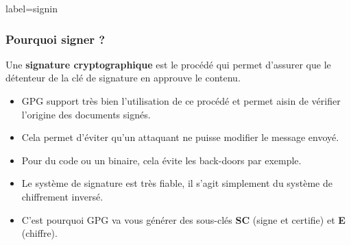\documentclass{beamer}
\begin{document}
        \begin{frame}{label=signin}
            \frametitle{Pourquoi signer ?}
            Une \textbf{signature cryptographique} est le procédé qui permet d'assurer que le détenteur de la clé de signature en approuve le contenu.
            \begin{center}
                \begin{itemize}
                    \item GPG support très bien l'utilisation de ce procédé et permet aisin de vérifier l'origine des documents signés.
                    \item Cela permet d'éviter qu'un attaquant ne puisse modifier le message envoyé.
                    \item Pour du code ou un binaire, cela évite les back-doors par exemple.
                    \item Le système de signature est très fiable, il s'agit simplement du système de chiffrement inversé.
                    \item C'est pourquoi GPG va vous générer des sous-clés \textbf{SC} (signe et certifie) et \textbf{E} (chiffre).
                \end{itemize}
            \end{center}
        \end{frame}
\end{document}

